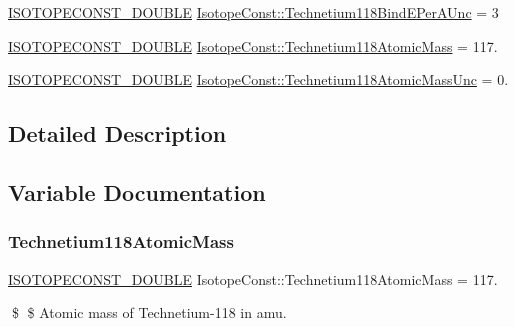 \begin{DoxyCompactItemize}
\mbox{\hyperlink{group___isotope_const-_macros_ga8f45a7272ce02c0b4c65c44636ed719a}{I\+S\+O\+T\+O\+P\+E\+C\+O\+N\+S\+T\+\_\+\+D\+O\+U\+B\+LE}} \mbox{\hyperlink{group___isotope_const-_technetium-_tc118_gad287bb0486e96eb1d87b8e07e6eed192}{Isotope\+Const\+::\+Technetium118\+Bind\+E\+Per\+A\+Unc}} = 3
\item 
\mbox{\hyperlink{group___isotope_const-_macros_ga8f45a7272ce02c0b4c65c44636ed719a}{I\+S\+O\+T\+O\+P\+E\+C\+O\+N\+S\+T\+\_\+\+D\+O\+U\+B\+LE}} \mbox{\hyperlink{group___isotope_const-_technetium-_tc118_gaba3530874ef6f1aceef4500fb1de3e22}{Isotope\+Const\+::\+Technetium118\+Atomic\+Mass}} = 117.
\item 
\mbox{\hyperlink{group___isotope_const-_macros_ga8f45a7272ce02c0b4c65c44636ed719a}{I\+S\+O\+T\+O\+P\+E\+C\+O\+N\+S\+T\+\_\+\+D\+O\+U\+B\+LE}} \mbox{\hyperlink{group___isotope_const-_technetium-_tc118_ga18240d2d5c443f1fbee0750be7ae5af5}{Isotope\+Const\+::\+Technetium118\+Atomic\+Mass\+Unc}} = 0.
\end{DoxyCompactItemize}


\subsection{Detailed Description}


\subsection{Variable Documentation}
\mbox{\label{group___isotope_const-_technetium-_tc118_gaba3530874ef6f1aceef4500fb1de3e22}} 
\subsubsection{\texorpdfstring{Technetium118\+Atomic\+Mass}{Technetium118AtomicMass}}
{\footnotesize\ttfamily \mbox{\hyperlink{group___isotope_const-_macros_ga8f45a7272ce02c0b4c65c44636ed719a}{I\+S\+O\+T\+O\+P\+E\+C\+O\+N\+S\+T\+\_\+\+D\+O\+U\+B\+LE}} Isotope\+Const\+::\+Technetium118\+Atomic\+Mass = 117.}

\$ \$ Atomic mass of Technetium-\/118 in amu. \mbox{\label{group___isotope_const-_technetium-_tc118_ga18240d2d5c443f1fbee0750be7ae5af5}} 
